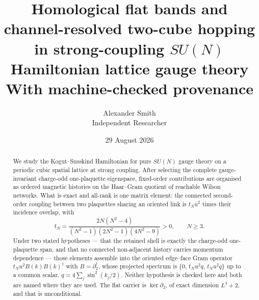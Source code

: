 \documentclass[10pt,twocolumn]{article}
\theoremstyle{plain}
\theoremstyle{definition}
\theoremstyle{remark}
\newcommand{\dg}{^{\dagger}}
\begin{document}
\title{\bfseries Homological flat bands and channel-resolved two-cube hopping
in strong-coupling $SU(N)$ Hamiltonian lattice gauge theory\\[2mm]
\large With machine-checked provenance}
\author{Alexander Smith\\ \small Independent Researcher}
\date{29 August 2026}
\maketitle

\begin{abstract}
\noindent
We study the Kogut--Susskind Hamiltonian for pure $SU(N)$ gauge theory on a
periodic cubic spatial lattice at strong coupling. After selecting the
complete gauge-invariant charge-odd one-plaquette eigenspace, fixed-order
contributions are organised as ordered magnetic histories on the Haar--Gram
quotient of reachable Wilson networks. What is exact and all-rank is one matrix
element: the connected second-order coupling between two plaquettes sharing an
oriented link is $t_Nu^2$ times their incidence overlap, with
\[
  t_N=\frac{2N(N^2-4)}{(N^2-1)(2N^2-1)(4N^2-9)}>0,\qquad N\ge 3 .
\]
Under two stated hypotheses --- that the retained shell is exactly the
charge-odd one-plaquette span, and that no connected non-adjacent history
carries momentum dependence --- those elements assemble into the oriented
edge--face Gram operator $t_Nu^2B(k)B(k)\dg$ with $B=\partial_2\dg$, whose
projected spectrum is $\{0,\,t_Nu^2q,\,t_Nu^2q\}$ up to a common scalar,
$q=4\sum_j\sin^2(k_j/2)$. Neither hypothesis is checked here and both are named
where they are used. The flat carrier is $\ker\partial_2$, of exact dimension
$L^3+2$, and that is unconditional.


\end{abstract}
\end{document}

